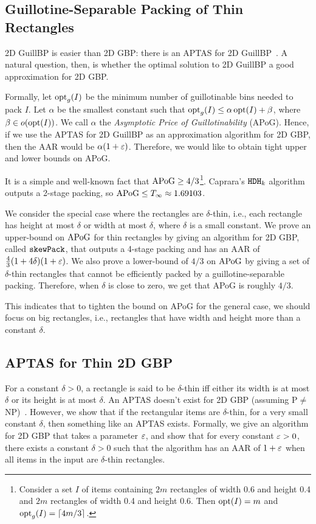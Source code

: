 \subsection{Guillotine-Separable Packing of Thin Rectangles}

2D GuillBP is easier than 2D GBP: there is an APTAS for 2D GuillBP~\cite{bansal2005tale}.
A natural question, then, is whether the optimal solution to 2D GuillBP
a good approximation for 2D GBP.

Formally, let $\operatorname{opt}_g(I)$ be the minimum number of guillotinable bins needed to pack $I$.
Let $\alpha$ be the smallest constant such that
$\operatorname{opt}_g(I) \le \alpha\operatorname{opt}(I) + \beta$, where $\beta \in o(\operatorname{opt}(I))$.
We call $\alpha$ the \emph{Asymptotic Price of Guillotinability} (APoG).
Hence, if we use the APTAS for 2D GuillBP as an approximation algorithm for 2D GBP,
then the AAR would be $\alpha(1 + \varepsilon)$.
Therefore, we would like to obtain tight upper and lower bounds on APoG.

It is a simple and well-known fact that $\mathrm{APoG} \ge 4/3$\footnote{Consider
a set $I$ of items containing $2m$ rectangles of width 0.6 and height 0.4 and
$2m$ rectangles of width 0.4 and height 0.6.
Then $\operatorname{opt}(I) = m$ and $\operatorname{opt}_g(I) = \left\lceil 4m/3 \right\rceil$.}.
Caprara's $\operatorname{\mathtt{HDH}}_{k}$ algorithm~\cite{caprara2008} outputs a 2-stage packing,
so $\mathrm{APoG} \le T_{\infty} \approx 1.69103$.

We consider the special case where the rectangles are $\delta$-thin,
i.e., each rectangle has height at most $\delta$ or width at most $\delta$,
where $\delta$ is a small constant.
We prove an upper-bound on $\mathrm{APoG}$ for thin rectangles by
giving an algorithm for 2D GBP, called $\operatorname{\mathtt{skewPack}}$,
that outputs a 4-stage packing and has an AAR of $\frac{4}{3}(1+4\delta)(1+\varepsilon)$.
We also prove a lower-bound of $4/3$ on $\mathrm{APoG}$ by giving
a set of $\delta$-thin rectangles that cannot be efficiently
packed by a guillotine-separable packing.
Therefore, when $\delta$ is close to zero, we get that APoG is roughly $4/3$.

This indicates that to tighten the bound on APoG for the general case,
we should focus on big rectangles, i.e., rectangles that have width and height
more than a constant $\delta$.

\subsection{APTAS for Thin 2D GBP}

For a constant $\delta > 0$, a rectangle is said to be $\delta$-thin
iff either its width is at most $\delta$ or its height is at most $\delta$.
An APTAS doesn't exist for 2D GBP (assuming P$\neq$NP)~\cite{bansal2006bin}.
However, we show that if the rectangular items are $\delta$-thin,
for a very small constant $\delta$, then something like an APTAS exists.
Formally, we give an algorithm for 2D GBP that takes a parameter $\varepsilon$,
and show that for every constant $\varepsilon > 0$, there exists a constant $\delta > 0$
such that the algorithm has an AAR of $1+\varepsilon$
when all items in the input are $\delta$-thin rectangles.

